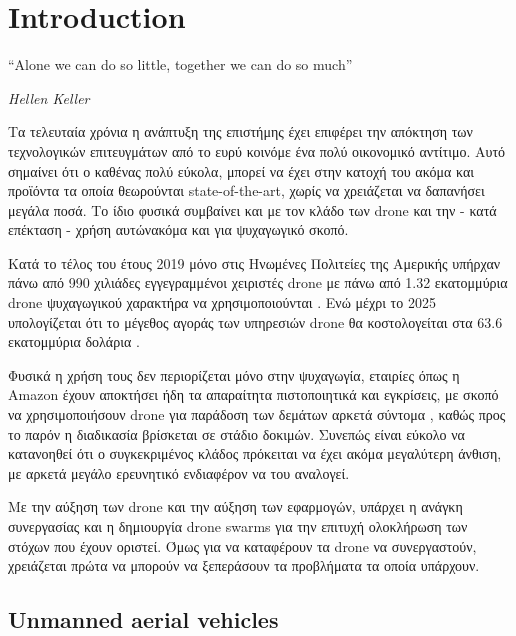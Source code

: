 \chapter{Introduction} %
\label{chap:Chapter1}  %
\epigraph{``Alone we can do so little, together we can do so much” }{\textit{Hellen Keller}}


Τα τελευταία χρόνια η ανάπτυξη της επιστήμης έχει επιφέρει την απόκτηση των 
τεχνολογικών επιτευγμάτων από το ευρύ κοινό\udot με ένα πολύ οικονομικό αντίτιμο. Αυτό σημαίνει
ότι ο καθένας πολύ εύκολα, μπορεί να έχει στην κατοχή του ακόμα και προϊόντα τα οποία θεωρούνται 
state-of-the-art, χωρίς να χρειάζεται να δαπανήσει μεγάλα ποσά. 
Το ίδιο φυσικά συμβαίνει και με τον κλάδο των drone και την - κατά επέκταση - χρήση αυτών\udot ακόμα και 
για ψυχαγωγικό σκοπό.  

Κατά το τέλος του έτους 2019 μόνο στις Ηνωμένες Πολιτείες της Αμερικής υπήρχαν πάνω από 
990 χιλιάδες εγγεγραμμένοι χειριστές drone με πάνω από 1.32 εκατομμύρια drone ψυχαγωγικού 
χαρακτήρα να χρησιμοποιούνται \cite{2019-drone-statistic}. Ενώ μέχρι το 2025 υπολογίζεται 
ότι το μέγεθος αγοράς των υπηρεσιών drone θα κοστολογείται στα 63.6 εκατομμύρια δολάρια \cite{expected-drone-market}.

Φυσικά η χρήση τους δεν περιορίζεται μόνο στην ψυχαγωγία, εταιρίες όπως η Amazon έχουν 
αποκτήσει ήδη τα απαραίτητα πιστοποιητικά και εγκρίσεις, με σκοπό να 
χρησιμοποιήσουν drone για παράδοση των δεμάτων αρκετά σύντομα \cite{amazon-drones}, καθώς προς το παρόν
η διαδικασία βρίσκεται σε στάδιο δοκιμών. 
Συνεπώς είναι εύκολο να κατανοηθεί ότι ο συγκεκριμένος κλάδος πρόκειται να έχει ακόμα μεγαλύτερη 
άνθιση, με αρκετά μεγάλο ερευνητικό ενδιαφέρον να του αναλογεί.   

Με την αύξηση των drone και την αύξηση των εφαρμογών, υπάρχει η ανάγκη συνε\-ργασίας και η δημιουργία drone swarms 
για την επιτυχή ολοκλήρωση των στόχων που έχουν οριστεί. Όμως για να καταφέρουν τα drone
να συνεργαστούν, χρειάζεται πρώτα να μπορούν να ξεπεράσουν τα προβλήματα τα οποία υπάρχουν.

\newpage

\section{Unmanned aerial vehicles} \label{sec:Chapter1-1} 

